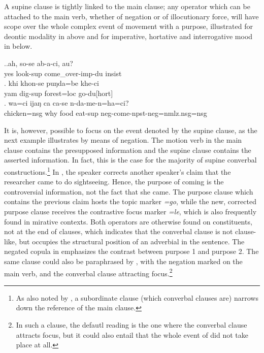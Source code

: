 A supine clause is tightly linked to the main clause; any operator which can be attached to the main verb, whether of negation or of illocutionary force, will have scope over the whole complex event of movement with a purpose, illustrated for deontic modality in \LLast[b] above and for imperative, hortative and interrogative mood in \Next below.  

\ex.\ag.ah,    so-se           ab-a-ci,      au?\\
yes look{\sc -sup} come\_over{\sc -imp-du} {\sc insist}\\
 
\bg. khi khon-se         puŋda=be    khe-ci\\
yam dig{\sc -sup} forest{\sc =loc} go{\sc -du[hort]}\\
 
\bg.  wa=ci         ijaŋ ca  ca-se    n-da-me-n=ha=ci?\\
chicken{\sc  =nsg} why food eat{\sc -sup} {\sc neg-}come{\sc -npst-neg=nmlz.nsg=nsg}\\
 

It is, however, possible to focus on the event denoted by the supine clause, as the next example illustrates by means of negation. The motion verb in the main clause contains the presupposed information and the supine clause contains the asserted information. In fact, this is the case for the majority of supine converbal constructions.\footnote{As also noted by \citet[12-7]{Haspelmath1995The-converb}, a subordinate clause (which converbal clauses are) narrows down the reference of the main clause.} In \Next[a], the speaker corrects another speaker's claim that the researcher came to do sightseeing. Hence, the purpose of coming is the controversial information, not the fact that she came. The purpose clause which contains the previous claim hosts the topic marker \emph{=go}, while the new, corrected  purpose clause receives the contrastive focus marker \emph{=le}, which is also frequently found in mirative contexts. Both operators are otherwise found on constituents, not at the end of clauses, which indicates that the converbal clause is not clause-like, but occupies the structural position of an adverbial in the sentence. The negated copula in \Next[a] emphasizes the contrast between purpose 1 and purpose 2. The same clause could also be paraphrased by \Next[b], with the negation marked on the main verb, and the converbal clause attracting focus.\footnote{In such a clause, the defautl reading is the one where the converbal clause attracts focus, but it could also entail that the whole event of  did not take place at all.} 
 	
